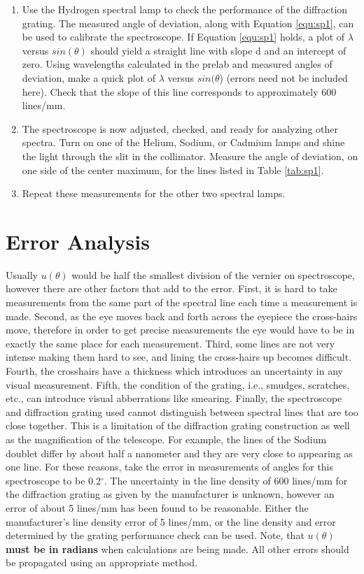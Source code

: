 \begin{enumerate}
\item Use the Hydrogen spectral lamp to check the performance of the diffraction grating. The measured angle of deviation, along with Equation \ref{equ:sp1}, can be used to calibrate the spectroscope. If Equation \ref{equ:sp1} holds, a plot of $\lambda$ versus $sin(\theta)$ should yield a straight line with slope d and an intercept of zero. Using wavelengths calculated in the prelab and measured angles of deviation, make a quick plot of $\lambda$ versus $sin(\theta$) (errors need not be included here). Check that the slope of this line corresponds to approximately 600 lines/mm.

\item The spectroscope is now adjusted, checked, and ready for analyzing other spectra. Turn on one of the Helium, Sodium, or Cadmium lamps and shine the light through the slit in the collimator. Measure the angle of deviation, on one side of the center maximum, for the lines listed in Table \ref{tab:sp1}.

\item Repeat these measurements for the other two spectral lamps.

\end{enumerate}

\section{Error Analysis}
Usually $u(\theta)$ would be half the smallest division of the vernier on spectroscope, however there are other factors that add to the error. First, it is hard to take measurements from the same part of the spectral line each time a measurement is made. Second, as the eye moves back and forth across the eyepiece the cross-hairs move, therefore in order to get precise measurements the eye would have to be in exactly the same place for each measurement. Third, some lines are not very intense making them hard to see, and lining the cross-hairs up becomes difficult. Fourth, the crosshairs have a thickness which introduces an uncertainty in any visual measurement. Fifth, the condition of the grating, i.e., smudges, scratches, etc., can introduce visual abberrations like smearing. Finally, the spectroscope and diffraction grating used cannot distinguish between spectral lines that are too close together. This is a limitation of the diffraction grating construction as well as the magnification of the telescope. For example, the lines of the Sodium doublet differ by about half a nanometer and they are very close to appearing as one line. For these reasons, take the error in measurements of angles for this spectroscope to be 0.2$^{\circ}$. The uncertainty in the line density of 600 lines/mm for the diffraction grating as given by the manufacturer is unknown, however an error of about 5 lines/mm has been found to be reasonable. Either the manufacturer's line density error of 5 lines/mm, or the line density and error determined by the grating performance check can be used. Note, that {\bf $u(\theta)$ must be in radians} when calculations are being made. All other errors should be propagated using an appropriate method. 

